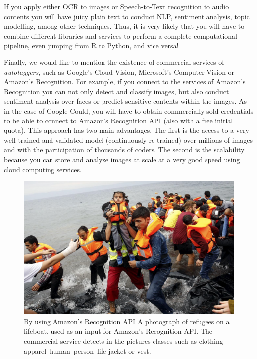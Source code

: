 If you apply either OCR to images or Speech-to-Text recognition to audio contents you will have juicy plain text to conduct NLP, sentiment analysis, topic modelling, among other techniques.  Thus, it is very likely that you will have to combine different libraries and services to perform a complete computational pipeline, even jumping from R to Python, and vice versa!

Finally, we would like to mention the existence of commercial services of \textit{autotaggers}, such as Google's Cloud Vision, Microsoft's Computer Vision or Amazon's Recognition. For example, if you connect to the services of Amazon's Recognition you can not only detect and classify images, but also conduct sentiment analysis over faces or predict sensitive contents within the images. As in the case of Google Could, you will have to obtain commercially sold credentials to be able to connect to Amazon's Recognition API (also with a free initial quota). This approach has two main advantages. The first is the access to a very well trained and validated model (continuously re-trained) over millions of images and with the participation of thousands of coders. The second is the scalability because you can store and analyze images at scale at a very good speed using cloud computing services.

\begin{figure}
\centering
\includegraphics[width=0.9\linewidth]{figures/ch15_refugees.png}
\caption{By using Amazon's Recognition API
A photograph of refugees on a lifeboat, used as an input for Amazon's Recognition API. The commercial service detects in the pictures classes such as clothing\, apparel\, human\, person\, life jacket or vest.}
\label{fig:refugees}
\end{figure}

